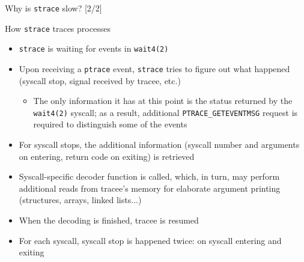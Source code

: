 \documentclass[unicode,aspectratio=169]{beamer}
\begin{document}
\begin{frame}{Why is \texttt{strace} slow? \hfill [2/2]}
\begin{block}{\large How \texttt{strace} traces processes}
\begin{itemize}
  \item \texttt{strace} is waiting for events in \texttt{wait4(2)}
  \item Upon receiving a \texttt{ptrace} event, \texttt{strace} tries to figure
        out what happened (syscall stop, signal received by tracee, etc.)
  \begin{itemize}
    \item The only information it has at this point is the status returned
          by the \texttt{wait4(2)} syscall; as a result, additional
	  \texttt{PTRACE\_GETEVENTMSG} request is required to distinguish
	  some of the events
  \end{itemize}
  \item For syscall stops, the additional information (syscall number and
        arguments on entering, return code on exiting) is retrieved
  \item Syscall-specific decoder function is called, which, in turn, may perform
        additional reads from tracee's memory for elaborate argument printing
	(structures, arrays, linked lists...)
  \item When the decoding is finished, tracee is resumed
  \item For each syscall, syscall stop is happened twice: on syscall entering
        and exiting
\end{itemize}
\end{block}
\end{frame}

\end{document}
